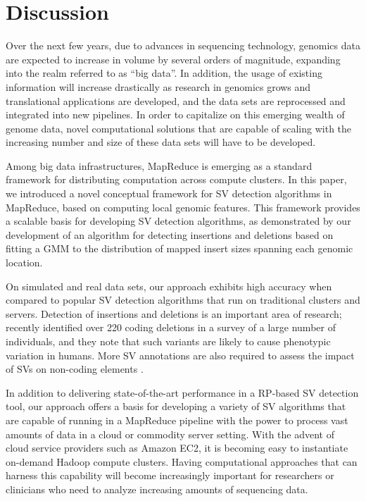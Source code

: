 \documentclass[11pt]{article}
\begin{document}
\section{Discussion}\label{Discussion}

Over the next few years, due to advances in sequencing technology, genomics data are expected to increase in volume by several orders of magnitude, expanding into the realm referred to as ``big data''. In addition, the usage of existing information will increase drastically as research in genomics grows and translational applications are developed, and the data sets are reprocessed and integrated into new pipelines. In order to capitalize on this emerging wealth of genome data, novel computational solutions that are capable of scaling with the increasing number and size of these data sets will have to be developed. 

Among big data infrastructures, MapReduce is emerging as a standard framework for distributing computation across compute clusters. In this paper, we introduced a novel conceptual framework for SV detection algorithms in MapReduce, based on computing local genomic features. This framework provides a scalable basis for developing SV detection algorithms, as demonstrated by our development of an algorithm for detecting insertions and deletions based on fitting a GMM to the distribution of mapped insert sizes spanning each genomic location.

On simulated and real data sets, our approach exhibits high accuracy when compared to popular SV detection algorithms that run on traditional clusters and servers. Detection of insertions and deletions is an important area of research; \textcite{Mills:2011fi} recently identified over 220 coding deletions in a survey of a large number of individuals, and they note that such variants are likely to cause phenotypic variation in humans. More SV annotations are also required to assess the impact of SVs on non-coding elements \autocite{Mu:2011br}.

In addition to delivering state-of-the-art performance in a RP-based SV detection tool, our approach offers a basis for developing a variety of SV algorithms that are capable of running in a MapReduce pipeline with the power to process vast amounts of data in a cloud or commodity server setting. With the advent of cloud service providers such as Amazon EC2, it is becoming easy to instantiate on-demand Hadoop compute clusters. Having computational approaches that can harness this capability will become increasingly important for researchers or clinicians who need to analyze increasing amounts of sequencing data.
\end{document}
